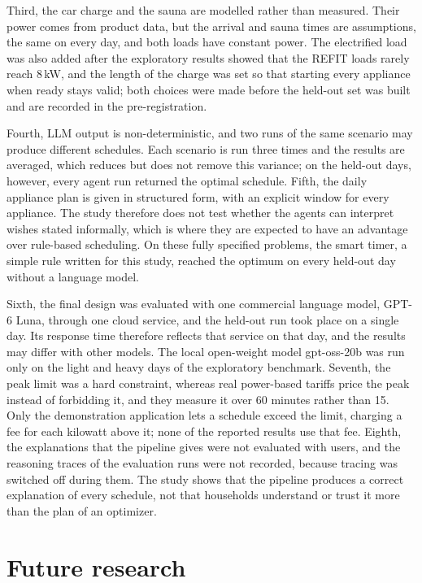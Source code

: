 \documentclass[12pt,a4paper]{report}
\begin{document}
Third, the car charge and the sauna are modelled rather than measured.
Their power comes from product data, but the arrival and sauna times
are assumptions, the same on every day, and both loads have constant
power. The electrified load was also added after the exploratory results
showed that the REFIT loads rarely reach 8\,kW, and the length of the
charge was set so that starting every appliance when ready stays valid;
both choices were made before the held-out set was built and are
recorded in the pre-registration.

Fourth, LLM output is non-deterministic, and two runs of the same
scenario may produce different schedules. Each scenario is run three
times and the results are averaged, which reduces but does not remove
this variance; on the held-out days, however, every agent run returned
the optimal schedule. Fifth, the daily appliance plan is given in
structured form, with an explicit window for every appliance. The study
therefore does not test whether the agents can interpret wishes stated
informally, which is where they are expected to have an advantage over
rule-based scheduling. On these fully specified problems, the smart
timer, a simple rule written for this study, reached the optimum on
every held-out day without a language model.

Sixth, the final design was evaluated with one commercial language
model, GPT-6 Luna, through one cloud service, and the held-out run took
place on a single day. Its response time therefore reflects that
service on that day, and the results may differ with other models. The
local open-weight model gpt-oss-20b was run only on the light and heavy
days of the exploratory benchmark. Seventh, the peak limit was a hard
constraint, whereas real power-based tariffs price the peak instead of
forbidding it, and they measure it over 60 minutes rather than 15. Only
the demonstration application lets a schedule exceed the limit, charging
a fee for each kilowatt above it; none of the reported results use that
fee. Eighth, the explanations that the pipeline gives were not
evaluated with users, and the reasoning traces of the evaluation runs
were not recorded, because tracing was switched off during them. The
study shows that the pipeline produces a correct explanation of every
schedule, not that households understand or trust it more than the plan
of an optimizer.

\section{Future research}
\label{sec:future}
\end{document}

